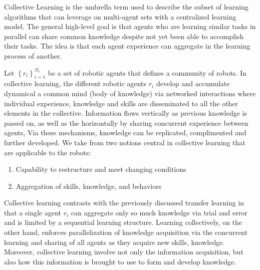 Collective Learning is the umbrella term used to describe the subset of learning algorithms that can leverage on multi-agent sets with a centralized learning model. The general high-level goal is that agents who are learning similar tasks in parallel can share common knowledge despite not yet been able to accomplish their tasks. The idea is that each agent experience can aggregate in the learning process of another. 

Let $ \left\lbrace r_i \right\rbrace_{i=1}^{N_r} $ be a set of robotic agents that defines a community of robots. In collective learning, the different robotic agents $ r_i $ develop and accumulate dynamical a common mind (body of knowledge) via networked interactions where individual experience, knowledge and skills are disseminated to all the other elements in the collective. Information flows vertically as previous knowledge is passed on, as well as the horizontally by sharing concurrent experience between agents, Via these mechanisms, knowledge can be replicated, complimented and further developed. We take from \cite{Garavan2012CollectiveLearning} two notions central in collective learning that are applicable to the robots:
\begin{enumerate}
	\item Capability to restructure and meet changing conditions
	\item Aggregation of skills, knowledge, and behaviors
\end{enumerate}

Collective learning contrasts with the previously discussed transfer learning in that a single agent $ r_i $ can aggregate only so much knowledge via trial and error and is limited by a sequential learning structure. Learning collectively, on the other hand, enforces parallelization of knowledge acquisition via the concurrent learning and sharing of all agents as they acquire new skills, knowledge. Moreover, collective learning involve not only the information acquisition, but also how this information is brought to use to form and develop knowledge. 







